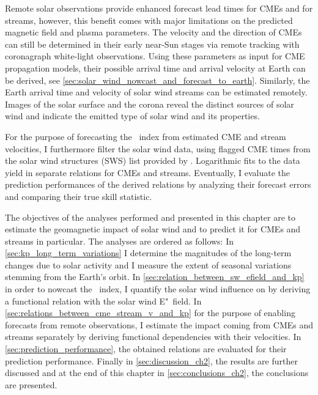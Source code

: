 Remote solar observations provide enhanced forecast lead times for CMEs and for streams, however, this benefit comes with major limitations on the predicted magnetic field and plasma parameters. The velocity and the direction of CMEs can still be determined in their early near-Sun stages via remote tracking with coronagraph white-light observations. Using these parameters as input for CME propagation models, their possible arrival time and arrival velocity at Earth can be derived, see \autoref{sec:solar_wind_nowcast_and_forecast_to_earth}. Similarly, the Earth arrival time and velocity of solar wind streams can be estimated remotely. Images of the solar surface and the corona reveal the distinct sources of solar wind and indicate the emitted type of solar wind and its properties.

For the purpose of forecasting the \Kp~index from estimated CME and stream velocities, I furthermore filter the solar wind data, using flagged CME times from the solar wind structures (SWS) list provided by \citet{Richardson2012}. Logarithmic fits to the data yield in separate \Kp{} relations for CMEs and streams.
Eventually, I evaluate the prediction performances of the derived relations by analyzing their forecast errors and comparing their true skill statistic.

The objectives of the analyses performed and presented in this chapter are to estimate the geomagnetic impact of solar wind and to predict it for CMEs and streams in particular. The analyses are ordered as follows: In \autoref{sec:kp_long_term_variations} I determine the magnitudes of the long-term \Kp{} changes due to solar activity and I measure the extent of seasonal variations stemming from the Earth's orbit. In \autoref{sec:relation_between_sw_efield_and_kp} in order to nowcast the \Kp~index, I quantify the solar wind influence on \Kp{} by deriving a functional relation with the solar wind E"~field. In \autoref{sec:relations_between_cme_stream_v_and_kp} for the purpose of enabling \Kp{} forecasts from remote observations, I estimate the \Kp{} impact coming from CMEs and streams separately by deriving functional dependencies with their velocities. In \autoref{sec:prediction_performance}, the obtained \Kp{} relations are evaluated for their prediction performance. Finally in \autoref{sec:discussion_ch2}, the results are further discussed and at the end of this chapter in \autoref{sec:conclusions_ch2}, the conclusions are presented.


